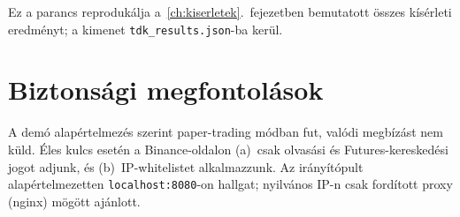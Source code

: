Ez a parancs reprodukálja a~\ref{ch:kiserletek}.~fejezetben bemutatott
összes kísérleti eredményt; a kimenet \texttt{tdk\_results.json}-ba kerül.

\section{Biztonsági megfontolások}

A demó alapértelmezés szerint paper-trading módban fut, valódi megbízást
nem küld. Éles kulcs esetén a Binance-oldalon (a)~csak olvasási és
Futures-kereskedési jogot adjunk, és (b)~IP-whitelistet alkalmazzunk.
Az irányítópult alapértelmezetten \texttt{localhost:8080}-on hallgat;
nyilvános IP-n csak fordított proxy (nginx) mögött ajánlott.
